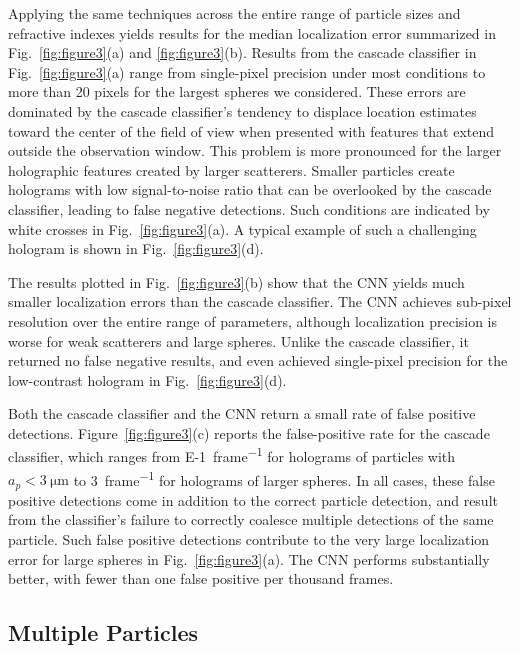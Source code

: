 \documentclass[10pt,letterpaper]{article}
\begin{document}
Applying the same techniques across the entire range of particle
sizes and refractive indexes yields results for the median
localization error summarized in
Fig.~\ref{fig:figure3}(a) and \ref{fig:figure3}(b).
Results from the cascade classifier in Fig.~\ref{fig:figure3}(a)
range from single-pixel precision under most conditions to 
more than 20 pixels for the largest spheres we considered.
These errors are dominated by the cascade classifier's tendency
to displace location estimates toward the center of the
field of view when presented with features that extend outside
the observation window.
This problem is more pronounced
for the larger holographic features created by larger scatterers.
Smaller particles create holograms with low signal-to-noise 
ratio that can be overlooked by the cascade classifier, leading
to false negative detections.
Such conditions are indicated by white crosses in
Fig.~\ref{fig:figure3}(a).
A typical example of such a challenging hologram is
shown in Fig.~\ref{fig:figure3}(d).

The results plotted in Fig.~\ref{fig:figure3}(b) show that
the CNN yields much smaller
localization errors than the cascade classifier.
The CNN achieves sub-pixel
resolution over the entire range of parameters,
although localization precision is worse for
weak scatterers and large spheres.
Unlike the cascade classifier, it returned no
false negative results, and even achieved single-pixel
precision for the low-contrast hologram in
Fig.~\ref{fig:figure3}(d).

Both the cascade classifier and the CNN
return a small rate of false positive detections.
Figure~\ref{fig:figure3}(c) reports the false-positive
rate for the cascade classifier, which ranges from
\SI{E-1}{frame^{-1}} for holograms of particles with
$a_p < \SI{3}{\um}$
to \SI{3}{frame^{-1}} for holograms of larger spheres.
In all cases, these false positive detections come in addition
to the correct particle detection, and result from
the classifier's failure to correctly coalesce multiple detections
of the same particle.
Such false positive detections contribute to the very large
localization error for large spheres in Fig.~\ref{fig:figure3}(a).
The CNN performs substantially
better, with fewer than one false positive per thousand
frames.

\subsection{Multiple Particles}
\end{document}

